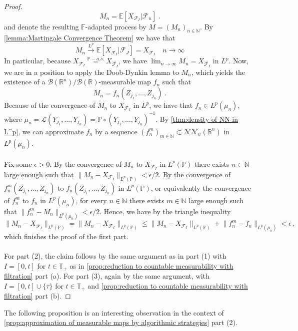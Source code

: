 \documentclass[11pt]{report}
\theoremstyle{plain} %
\theoremstyle{definition} %
\theoremstyle{remark} %
\begin{document}
\begin{proof}
\begin{equation}
    M_n=\mathbb{E}[X_{\mathcal{F}_I}|\mathcal{F}_n]\;.
\end{equation}
and denote the resulting \(\mathbb{F}\)-adapted process by \(M=(M_n)_{n\in\mathbb{N}}\). By \cref{lemma:Martingale Convergence Theorem} we have that 
\begin{equation}
    M_n\overset{L^p}{\to}\mathbb{E}[X_{\mathcal{F}_I}|\mathcal{F}_J]=X_{\mathcal{F}_I}\quad n\to\infty
\end{equation}
In particular, because \(X_{\mathcal{F}_I}\overset{\mathbb{P}-a.s.}{=}X_{\overline{\mathcal{F}_I}}\), we have \(\lim_{n\to\infty}M_n=X_{\overline{\mathcal{F}_I}}\) in \(L^p\). Now, we are in a position to apply the Doob-Dynkin lemma to \(M_n\), which yields the existence of a \(\mathcal{B}(\mathbb{R}^n)/\mathcal{B}(\mathbb{R})\)-measurable map \(f_n\) such that 
\begin{equation}
    M_n = f_n(Z_{j_1},\dots,Z_{j_n})\;.
\end{equation}
Because of the convergence of \(M_n\) to \(X_{\mathcal{F}_I}\) in \(L^p\), we have that \(f_n\in L^p(\mu_n)\), where \(\mu_n=\mathcal{L}(Y_{j_1},\dots,Y_{j_n})=\mathbb{P}\circ(Y_{j_1},\dots,Y_{j_n})^{-1}\). By \cref{thm:density of NN in L^p}, we can approximate \(f_n\) by a sequence \((f_n^m)_{m\in\mathbb{N}}\subset \mathcal{NN}_\psi({\mathbb{R}^n})\) in \(L^p(\mu_n)\). \\\\
Fix some \(\epsilon>0\). By the convergence of \(M_n\) to \(X_{\mathcal{F}_I}\) in \(L^p(\mathbb{P})\) there exists \(n\in\mathbb{N}\) large enough such that \(\lVert M_n-X_{\mathcal{F}_I}\rVert_{L^p(\mathbb{P})}<\epsilon/2\). By the convergence of \(f_n^m(Z_{j_1},\dots,Z_{j_n})\) to \(f_n(Z_{j_1},\dots,Z_{j_n})\) in \(L^p(\mathbb{P})\), or equivalently the convergence of \(f_n^m\) to \(f_n\) in \(L^p(\mu_n)\), for every \(n\in\mathbb{N}\) there exists \(m\in\mathbb{N}\) large enough such that \(\lVert f_n^m-M_n\rVert_{L^p(\mu_n)}<\epsilon/2\). Hence, we have by the triangle inequality
\begin{equation}
    \lVert M_n-X_{\overline{\mathcal{F}_I}}\rVert_{L^p(\mathbb{P})}=\lVert M_n-X_{\mathcal{F}_I}\rVert_{L^p(\mathbb{P})}\leq \lVert M_n-X_{\mathcal{F}_I}\rVert_{L^p(\mathbb{P})}+\lVert f_n^m-f_n\rVert_{L^p(\mu_n)}<\epsilon\,,
\end{equation}
which finishes the proof of the first part. \\\\
For part (2), the claim follows by the same argument as in part (1) with \(I=[0,t]\) for \(t\in\mathbb{T}_+\) as in \cref{prop:reduction to countable measurability with filtration} part (a). For part (3), again by the same argument, with \(I=[0,t]\cup\{\tau\}\) for \(t\in\mathbb{T}_+\) and \cref{prop:reduction to countable measurability with filtration} part (b). 
\end{proof}
The following proposition is an interesting observation in the context of \cref{prop:approximation of measurable maps by algorithmic strategies} part (2). 
\end{document}

